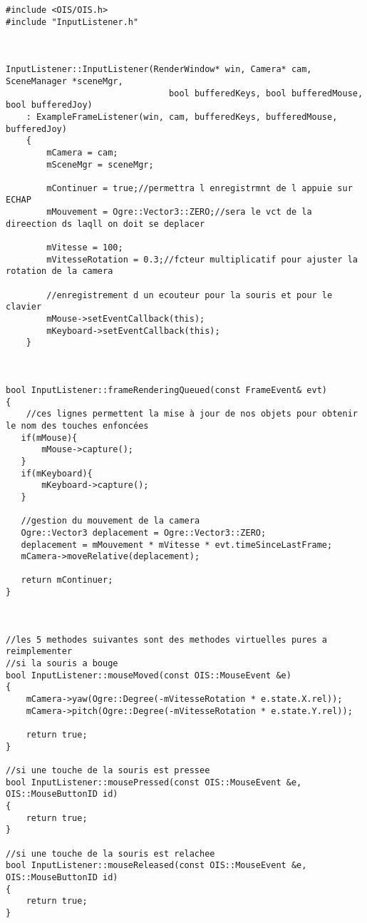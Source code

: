 \begin{lstlisting}[caption={InputListener.cpp}]



#include <OIS/OIS.h>
#include "InputListener.h"



InputListener::InputListener(RenderWindow* win, Camera* cam, SceneManager *sceneMgr,
                                bool bufferedKeys, bool bufferedMouse, bool bufferedJoy) 
    : ExampleFrameListener(win, cam, bufferedKeys, bufferedMouse, bufferedJoy)
    {
        mCamera = cam;
        mSceneMgr = sceneMgr;
        
        mContinuer = true;//permettra l enregistrmnt de l appuie sur ECHAP
        mMouvement = Ogre::Vector3::ZERO;//sera le vct de la direection ds laqll on doit se deplacer
        
        mVitesse = 100;
        mVitesseRotation = 0.3;//fcteur multiplicatif pour ajuster la rotation de la camera
       
        //enregistrement d un ecouteur pour la souris et pour le clavier
        mMouse->setEventCallback(this);
        mKeyboard->setEventCallback(this);
    }



bool InputListener::frameRenderingQueued(const FrameEvent& evt)
{
    //ces lignes permettent la mise à jour de nos objets pour obtenir le nom des touches enfoncées
   if(mMouse){
       mMouse->capture();
   }
   if(mKeyboard){
       mKeyboard->capture();
   }
   
   //gestion du mouvement de la camera
   Ogre::Vector3 deplacement = Ogre::Vector3::ZERO;
   deplacement = mMouvement * mVitesse * evt.timeSinceLastFrame;
   mCamera->moveRelative(deplacement);
    
   return mContinuer;
}



//les 5 methodes suivantes sont des methodes virtuelles pures a reimplementer
//si la souris a bouge
bool InputListener::mouseMoved(const OIS::MouseEvent &e)
{    
    mCamera->yaw(Ogre::Degree(-mVitesseRotation * e.state.X.rel));
    mCamera->pitch(Ogre::Degree(-mVitesseRotation * e.state.Y.rel));
    
    return true;
}

//si une touche de la souris est pressee
bool InputListener::mousePressed(const OIS::MouseEvent &e, OIS::MouseButtonID id)
{
    return true;
}

//si une touche de la souris est relachee 
bool InputListener::mouseReleased(const OIS::MouseEvent &e, OIS::MouseButtonID id)
{
    return true;
}


\end{lstlisting}
